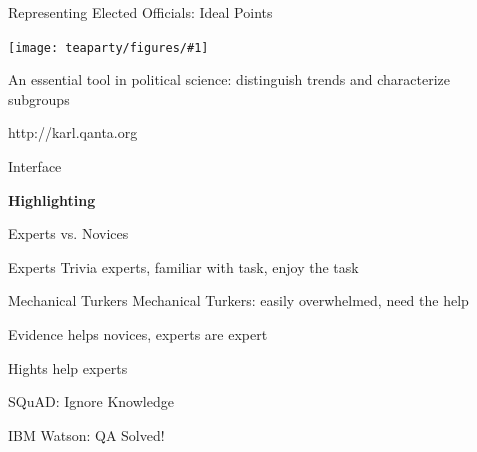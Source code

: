 \documentclass[xcolor=dvipsnames,xcolor=table]{beamer}
\newcommand{\gfxt}[2]{
\begin{center}
	\texttt{[image: teaparty/figures/\#1]}
\end{center}
}
\newcommand{\fsi}[2]{
\begin{frame}[plain]
\vspace*{-1pt}
\makebox[\linewidth]{\texttt{[image: \#1]}}
\begin{center}
#2
\end{center}
\end{frame}
}
\begin{document}





\begin{frame}{Representing Elected Officials: Ideal Points}
  \gfxt{dw_nominate}{.7}

  An essential tool in political science: distinguish trends and characterize subgroups
\end{frame}

\fsi{qb/karl}{http://karl.qanta.org}


\fsi{qb/augment/screenshot_all}{Interface}

\fsi{qb/augment/screenshot_guesses}{}

\fsi{qb/augment/screenshot_highlight}{{\bf Highlighting}}

\fsi{qb/augment/screenshot_evidence}{}

\begin{frame}{Experts vs. Novices}

 \begin{block}{Experts}
   Trivia experts, familiar with task, enjoy the task
 \end{block}

 \begin{block}{Mechanical Turkers}
   Mechanical Turkers: easily overwhelmed, need the help
 \end{block}

\end{frame}

\fsi{qb/augment/tools_acc}{Evidence helps novices, experts are expert}
\fsi{qb/augment/tools_buzz}{Hights help experts}



\fsi{qb/human_reading}{SQuAD: Ignore Knowledge}

\fsi{qb/jeopardy}{IBM Watson: QA Solved!}
\end{document}

